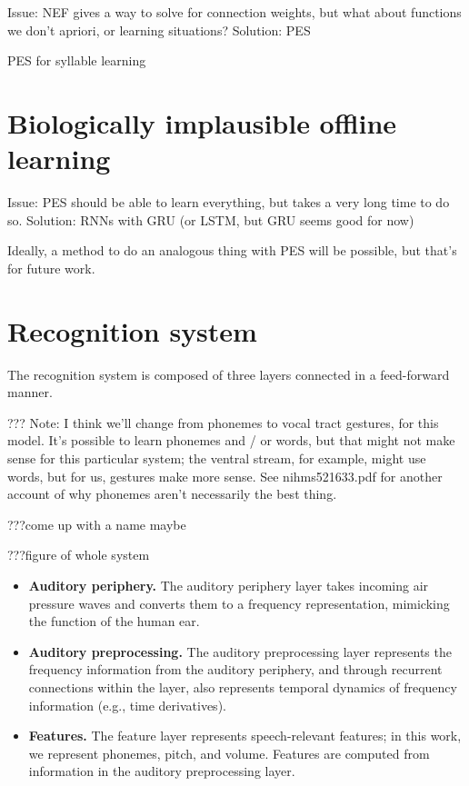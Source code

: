 Issue: NEF gives a way to solve for connection weights,
but what about functions we don't apriori,
or learning situations?
Solution: PES

PES for syllable learning

\section{Biologically implausible offline learning}

Issue: PES should be able to learn everything,
but takes a very long time to do so.
Solution: RNNs with GRU (or LSTM, but GRU seems good for now)

Ideally, a method to do an analogous thing with PES
will be possible, but that's for future work.


\section{Recognition system}

The recognition system is composed of
three layers connected in a feed-forward manner.

??? Note: I think we'll change from phonemes to vocal tract gestures,
for this model. It's possible to learn phonemes and / or words,
but that might not make sense for this particular system;
the ventral stream, for example, might use words,
but for us, gestures make more sense.
See nihms521633.pdf for another account of why phonemes
aren't necessarily the best thing.

???come up with a name maybe

???figure of whole system

\begin{itemize}
\item \textbf{Auditory periphery.} The auditory periphery layer
  takes incoming air pressure waves and converts them
  to a frequency representation,
  mimicking the function of the human ear.
\item \textbf{Auditory preprocessing.} The auditory preprocessing layer
  represents the frequency information from the auditory periphery,
  and through recurrent connections within the layer,
  also represents temporal dynamics of frequency information
  (e.g., time derivatives).
\item \textbf{Features.} The feature layer
  represents speech-relevant features;
  in this work, we represent phonemes, pitch, and volume.
  Features are computed from information
  in the auditory preprocessing layer.
\end{itemize}

